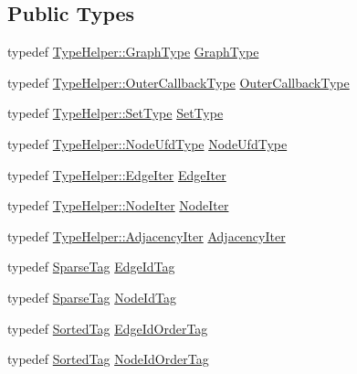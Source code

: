 \subsection*{Public Types}
\begin{DoxyCompactItemize}
\item 
typedef \hyperlink{structnifty_1_1graph_1_1EdgeContractionGraphWithSetsHelper_a7f5226bf25f277d906a526db55556cdf}{Type\+Helper\+::\+Graph\+Type} \hyperlink{classnifty_1_1graph_1_1EdgeContractionGraphWithSets_abadbbebcd10e37a1a3f59bb967accdf0}{Graph\+Type}
\item 
typedef \hyperlink{structnifty_1_1graph_1_1EdgeContractionGraphWithSetsHelper_a3e0b97cbc8de91c57e3dc83860edda69}{Type\+Helper\+::\+Outer\+Callback\+Type} \hyperlink{classnifty_1_1graph_1_1EdgeContractionGraphWithSets_a2f741cfabfa1fb4c5bfc75df557c1d12}{Outer\+Callback\+Type}
\item 
typedef \hyperlink{structnifty_1_1graph_1_1EdgeContractionGraphWithSetsHelper_acc1b924a2b02648491b614c8d69ca9fb}{Type\+Helper\+::\+Set\+Type} \hyperlink{classnifty_1_1graph_1_1EdgeContractionGraphWithSets_aeb3c8839879c1e126ceaca6bdfdff008}{Set\+Type}
\item 
typedef \hyperlink{structnifty_1_1graph_1_1EdgeContractionGraphWithSetsHelper_a254e8886638750a06342b813be34344d}{Type\+Helper\+::\+Node\+Ufd\+Type} \hyperlink{classnifty_1_1graph_1_1EdgeContractionGraphWithSets_ae340ffb867bc1eb19b139e879174607e}{Node\+Ufd\+Type}
\item 
typedef \hyperlink{structnifty_1_1graph_1_1EdgeContractionGraphWithSetsHelper_ab619625636cb861e740f216ea946fe06}{Type\+Helper\+::\+Edge\+Iter} \hyperlink{classnifty_1_1graph_1_1EdgeContractionGraphWithSets_abfc56b6e721306de50e308e7b199b18c}{Edge\+Iter}
\item 
typedef \hyperlink{structnifty_1_1graph_1_1EdgeContractionGraphWithSetsHelper_a6d07b232c0af5bf7170edb2eea02a8fb}{Type\+Helper\+::\+Node\+Iter} \hyperlink{classnifty_1_1graph_1_1EdgeContractionGraphWithSets_af9e889455b883d034bf708a0b5b05bee}{Node\+Iter}
\item 
typedef \hyperlink{structnifty_1_1graph_1_1EdgeContractionGraphWithSetsHelper_a9d9969291ab3cf558c7ad2f00a2c189d}{Type\+Helper\+::\+Adjacency\+Iter} \hyperlink{classnifty_1_1graph_1_1EdgeContractionGraphWithSets_ab4782e97223ab8ba2d207325aae693d6}{Adjacency\+Iter}
\item 
typedef \hyperlink{structnifty_1_1graph_1_1SparseTag}{Sparse\+Tag} \hyperlink{classnifty_1_1graph_1_1EdgeContractionGraphWithSets_a6ea951b692d5c6358003500873533f4d}{Edge\+Id\+Tag}
\item 
typedef \hyperlink{structnifty_1_1graph_1_1SparseTag}{Sparse\+Tag} \hyperlink{classnifty_1_1graph_1_1EdgeContractionGraphWithSets_a6dbcfb7d4bf82719837d809465f0ac06}{Node\+Id\+Tag}
\item 
typedef \hyperlink{structnifty_1_1graph_1_1SortedTag}{Sorted\+Tag} \hyperlink{classnifty_1_1graph_1_1EdgeContractionGraphWithSets_a6f0b9f8843ed508f1e934aee64a129a5}{Edge\+Id\+Order\+Tag}
\item 
typedef \hyperlink{structnifty_1_1graph_1_1SortedTag}{Sorted\+Tag} \hyperlink{classnifty_1_1graph_1_1EdgeContractionGraphWithSets_aacddf197fc8a2d4268d971bf026323f4}{Node\+Id\+Order\+Tag}
\end{DoxyCompactItemize}
